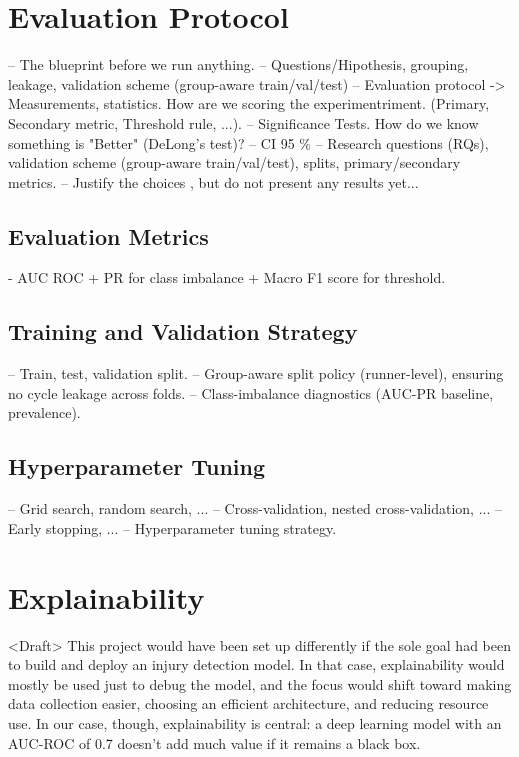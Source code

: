 \section{Evaluation Protocol}\label{sec:method-evaluation-protocol}
-- The blueprint before we run anything.
-- Questions/Hipothesis, grouping, leakage, validation scheme (group-aware train/val/test)
-- Evaluation protocol -> Measurements, statistics. How are we scoring the experimentriment. (Primary, Secondary metric, Threshold rule, ...).
-- Significance Tests. How do we know something is "Better" (DeLong's test)?
-- CI 95 \%
-- Research questions (RQs), validation scheme (group-aware train/val/test), splits, primary/secondary metrics.
-- Justify the choices , but do not present any results yet...

\subsection{Evaluation Metrics}\label{subsec:method-evaluation-metrics}
- AUC ROC + PR for class imbalance + Macro F1 score for threshold.

\subsection{Training and Validation Strategy}\label{subsec:method-training-validation-strategy}
-- Train, test, validation split.
-- Group-aware split policy (runner-level), ensuring no cycle leakage across folds.
-- Class-imbalance diagnostics (AUC-PR baseline, prevalence).

\subsection{Hyperparameter Tuning}\label{subsec:method-hyperparameter-tuning}
-- Grid search, random search, ...
-- Cross-validation, nested cross-validation, ...
-- Early stopping, ...
-- Hyperparameter tuning strategy.


\section{Explainability}\label{sec:method-explainability}
<Draft> This project would have been set up differently if the sole goal had been to build and deploy an injury detection model. In that case, explainability would mostly be used just to debug the model, and the focus would shift toward making data collection easier, choosing an efficient architecture, and reducing resource use. In our case, though, explainability is central: a deep learning model with an AUC-ROC of 0.7 doesn't add much value if it remains a black box.

